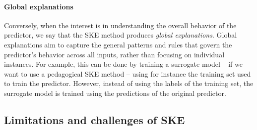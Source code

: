 \paragraph{Global explanations}\label{par:global-explanations}
%
Conversely, when the interest is in understanding the overall behavior of the predictor, we say that the \gls{SKE} method produces \emph{global explanations}.
%
Global explanations aim to capture the general patterns and rules that govern the predictor's behavior across all inputs, rather than focusing on individual instances.
%
For example, this can be done by training a surrogate model -- if we want to use a pedagogical \gls{SKE} method -- using for instance the training set used to train the predictor.
%
However, instead of using the labels of the training set, the surrogate model is trained using the predictions of the original predictor.


\subsection[Limitations and challenges of SKE]{Limitations and challenges of \Gls{SKE}}\label{subsec:limitations-and-challenges-of-ske}